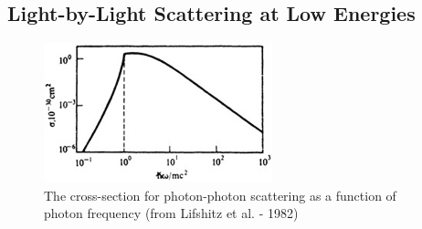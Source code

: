 \documentclass{article}
\begin{document}
\subsection{Light-by-Light Scattering at Low Energies}%

\begin{figure}[!th]
	\centering
	\includegraphics[width=0.5\linewidth]{figures/photon-photon-scattering.jpg}
	\caption{The cross-section for photon-photon scattering as a function of photon frequency (from Lifshitz et al. - 1982) }
	\label{fig:corss-secction}
\end{figure}
\end{document}
